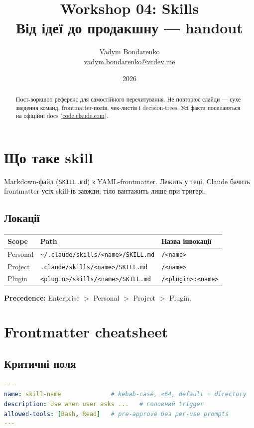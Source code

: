 \documentclass[11pt,a4paper]{article}
\title{%
  {\Huge\bfseries Workshop 04: Skills}\\[0.6em]
  {\large Від ідеї до продакшну — handout}
}
\author{Vadym Bondarenko \\ \small\href{mailto:vadym.bondarenko@vcdev.me}{vadym.bondarenko@vcdev.me}}
\date{2026}
\begin{document}
\maketitle

\begin{abstract}
Пост-воркшоп референс для самостійного перечитування. Не повторює слайди — сухе зведення команд, frontmatter-полів, чек-листів і decision-trees. Усі факти посилаються на офіційні docs (\href{https://code.claude.com/docs/en/skills}{code.claude.com}).
\end{abstract}

\tableofcontents
\newpage

\section{Що таке skill}

Markdown-файл (\texttt{SKILL.md}) з YAML-frontmatter. Лежить у теці. Claude бачить frontmatter усіх skill-ів завжди; тіло вантажить лише при тригері.

\subsection{Локації}

\begin{tabular}{lll}
\hline
\textbf{Scope} & \textbf{Path} & \textbf{Назва інвокації} \\
\hline
Personal & \texttt{\textasciitilde/.claude/skills/<name>/SKILL.md} & \texttt{/<name>} \\
Project & \texttt{.claude/skills/<name>/SKILL.md} & \texttt{/<name>} \\
Plugin & \texttt{<plugin>/skills/<name>/SKILL.md} & \texttt{/<plugin>:<name>} \\
\hline
\end{tabular}

\textbf{Precedence:} Enterprise $>$ Personal $>$ Project $>$ Plugin.

\section{Frontmatter cheatsheet}

\subsection{Критичні поля}

\begin{lstlisting}[language=yaml]
---
name: skill-name              # kebab-case, ≤64, default = directory
description: Use when user asks ...   # головний trigger
allowed-tools: [Bash, Read]   # pre-approve без per-use prompts
---
\end{lstlisting}
\end{document}
